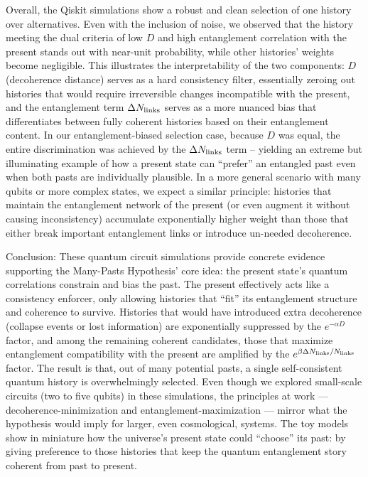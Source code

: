 \documentclass[11pt]{article}
\begin{document}
Overall, the Qiskit simulations show a robust and clean selection of one history over alternatives. Even with the inclusion of noise, we observed that the history meeting the dual criteria of low $D$ and high entanglement correlation with the present stands out with near-unit probability, while other histories’ weights become negligible. This illustrates the interpretability of the two components: $D$ (decoherence distance) serves as a hard consistency filter, essentially zeroing out histories that would require irreversible changes incompatible with the present, and the entanglement term $\Delta N_{\rm links}$ serves as a more nuanced bias that differentiates between fully coherent histories based on their entanglement content. In our entanglement-biased selection case, because $D$ was equal, the entire discrimination was achieved by the $\Delta N_{\rm links}$ term – yielding an extreme but illuminating example of how a present state can “prefer” an entangled past even when both pasts are individually plausible. In a more general scenario with many qubits or more complex states, we expect a similar principle: histories that maintain the entanglement network of the present (or even augment it without causing inconsistency) accumulate exponentially higher weight than those that either break important entanglement links or introduce un-needed decoherence.

Conclusion: These quantum circuit simulations provide concrete evidence supporting the Many-Pasts Hypothesis’ core idea: the present state’s quantum correlations constrain and bias the past. The present effectively acts like a consistency enforcer, only allowing histories that “fit” its entanglement structure and coherence to survive. Histories that would have introduced extra decoherence (collapse events or lost information) are exponentially suppressed by the $e^{-\alpha D}$ factor, and among the remaining coherent candidates, those that maximize entanglement compatibility with the present are amplified by the $e^{\beta \Delta N_{\rm links}/N_{\rm links}}$ factor. The result is that, out of many potential pasts, a single self-consistent quantum history is overwhelmingly selected. Even though we explored small-scale circuits (two to five qubits) in these simulations, the principles at work — decoherence-minimization and entanglement-maximization — mirror what the hypothesis would imply for larger, even cosmological, systems. The toy models show in miniature how the universe’s present state could “choose” its past: by giving preference to those histories that keep the quantum entanglement story coherent from past to present.
\end{document}
